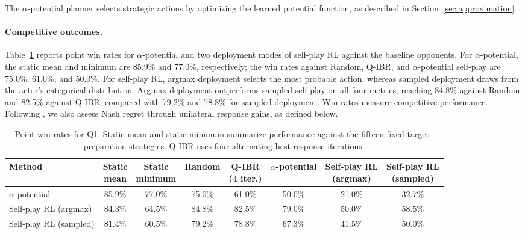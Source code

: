 \documentclass[pmlr]{jmlr}
\begin{document}
The $\alpha$-potential planner selects strategic actions by optimizing the learned potential function, as described in Section~\ref{sec:approximation}.

\paragraph{Competitive outcomes.}
Table~\ref{tab:performance} reports point win rates for $\alpha$-potential and two deployment modes of self-play RL against the baseline opponents. For $\alpha$-potential, the static mean and minimum are 85.9\% and 77.0\%, respectively; the win rates against Random, Q-IBR, and $\alpha$-potential self-play are 75.0\%, 61.0\%, and 50.0\%. For self-play RL, argmax deployment selects the most probable action, whereas sampled deployment draws from the actor's categorical distribution. Argmax deployment outperforms sampled self-play on all four metrics, reaching 84.8\% against Random and 82.5\% against Q-IBR, compared with 79.2\% and 78.8\% for sampled deployment. Win rates measure competitive performance. Following \citet{kalaria2025racer}, we also assess Nash regret through unilateral response gains, as defined below.
\begin{table}[t]
\centering
\small
\setlength{\tabcolsep}{2pt}
\begin{tabular}{lccccccc}
\toprule
Method & \shortstack{Static\\mean} & \shortstack{Static\\minimum} & Random & \shortstack{Q-IBR\\(4 iter.)} & $\alpha$-potential & \shortstack{Self-play RL \\(argmax)} & \shortstack{Self-play RL \\(sampled)}\\
\midrule
$\alpha$-potential & 85.9\% & 77.0\% & 75.0\% & 61.0\% & 50.0\% & 21.0\% & 32.7\%\\
Self-play RL (argmax) & 84.3\% & 64.5\% & 84.8\% & 82.5\% & 79.0\% & 50.0\% & 58.5\%\\
Self-play RL (sampled) & 81.4\% & 60.5\% & 79.2\% & 78.8\% & 67.3\% & 41.5\% & 50.0\%\\
\bottomrule
\end{tabular}
\caption{Point win rates for Q1. Static mean and static minimum summarize performance against the fifteen fixed target--preparation strategies. Q-IBR uses four alternating best-response iterations.}
\label{tab:performance}
\end{table}
\end{document}
